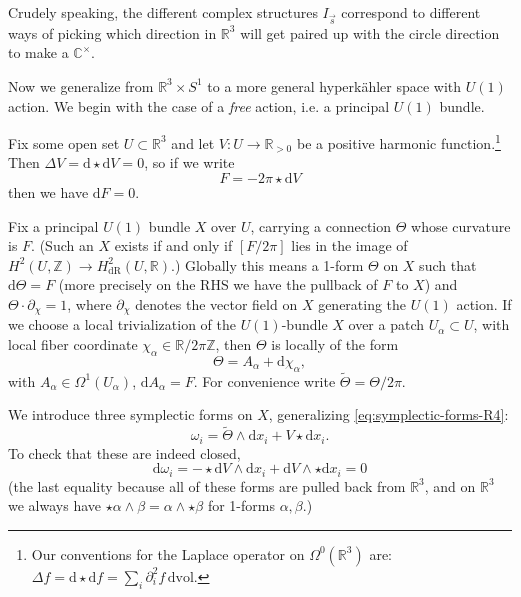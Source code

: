 \documentclass[12pt,letterpaper,reqno]{article}
\numberwithin{equation}{section}
\newcommand{\R}{\ensuremath{\mathbb R}}
\newcommand{\C}{\ensuremath{\mathbb C}}
\newcommand{\Z}{\ensuremath{\mathbb Z}}
\newcommand{\hk}{hyperk\"ahler\xspace}
\newcommand{\de}{\mathrm{d}}
\newcommand{\vol}{\mathrm{vol}}
\newcommand{\dR}{\mathrm{dR}}
\newcommand{\ti}[1]{\textit{#1}}
\begin{document}
Crudely speaking, the different complex structures 
$I_{\vec s}$ correspond to different ways of picking which 
direction in $\R^3$ will get 
paired up with the circle direction to make a $\C^\times$.

\begin{example} \label{exa:incomplete-gibbons-hawking}
Now we generalize from $\R^3 \times S^1$ to a more general
\hk space with $U(1)$ action. We begin with the case of 
a \ti{free} action, i.e. a principal
$U(1)$ bundle.

Fix some open set $U \subset \R^3$ and
let $V: U \to \R_{>0}$ be a positive harmonic function.\footnote{Our
conventions for the Laplace operator on $\Omega^0(\R^3)$ are:
$\Delta f = \de \star \de f = \sum_i \partial_i^2 f \, \de \vol$.}
Then $\Delta V = \de \star \de V = 0$, so if we write
\begin{equation}
  F = -2 \pi \star \de V
\end{equation}
then we have $\de F = 0$. 

Fix a principal $U(1)$ bundle $X$ over $U$, carrying a connection
$\Theta$ whose curvature is $F$.
(Such an $X$ exists if and only if $[F/2\pi]$ lies in 
the image of $H^2(U,\Z) \to H^2_{\dR}(U,\R)$.) 
Globally this means a 1-form $\Theta$ on $X$
such that $\de \Theta = F$ (more precisely on the RHS we have
the pullback of $F$ to $X$) and $\Theta \cdot \partial_\chi = 1$,
where $\partial_\chi$ denotes the vector field on $X$ 
generating the $U(1)$ action. If we choose a local
trivialization of the $U(1)$-bundle $X$ over a patch
$U_\alpha \subset U$, with local 
fiber coordinate $\chi_{\alpha} \in \R / 2 \pi \Z$, then $\Theta$ 
is locally of the form
\begin{equation}
 \Theta = A_\alpha + \de \chi_{\alpha},
\end{equation}
with $A_\alpha \in \Omega^1(U_\alpha)$, $\de A_\alpha = F$.
\newcommand{\tTheta}{\tilde\Theta}
For convenience write $\tTheta = \Theta / 2\pi$.

We introduce three symplectic forms on $X$,
generalizing \eqref{eq:symplectic-forms-R4}:
\begin{equation}
  \omega_i = \tTheta \wedge \de x_i + V \star \de x_i.
\end{equation}
To check that these are indeed closed,
\begin{equation}
  \de \omega_i = - \star \de V \wedge \de x_i + \de V \wedge \star \de x_i = 0
\end{equation}
(the last equality because all of these forms are pulled back
from $\R^3$, and on $\R^3$ we always have $\star \alpha \wedge \beta = \alpha \wedge \star \beta$ for 1-forms $\alpha, \beta$.)


\end{example}
\end{document}
